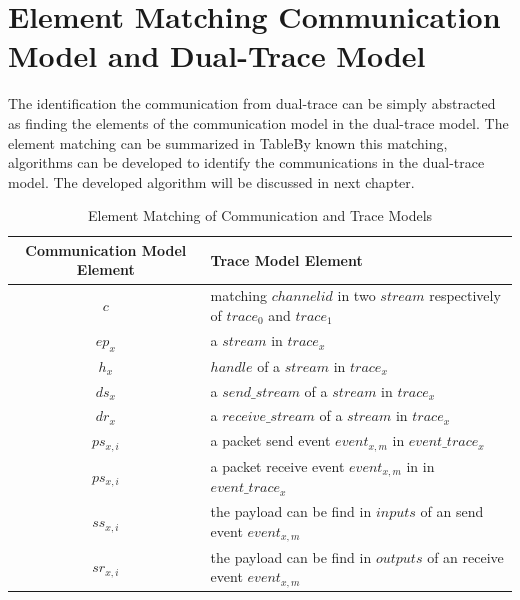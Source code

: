 \section{Element Matching Communication Model and Dual-Trace Model}
The identification the communication from dual-trace can be simply abstracted as finding the elements of the communication model in the dual-trace model. The element matching can be summarized in Table\. By known this matching, algorithms can be developed to identify the communications in the dual-trace model. The developed algorithm will be discussed in next chapter.
\begin{table}[H]
\centering
\caption{Element Matching of Communication and Trace Models}
\label{methodsInCategories}
\begin{tabular}{|c|l|}
 \hline
\textbf{Communication Model Element}& \textbf{Trace Model Element}\\
 \hline
$c$ & matching $channelid$ in two $stream$ respectively of $trace_{0}$ and $trace_{1}$  \\
 \hline
$ep_{x}$ & a $stream$ in $trace_{x}$ \\
 \hline
$h_{x}$ & $handle$ of a $stream$ in $trace_{x}$\\
 \hline
$ds_{x}$ & a $send\_stream$ of a $stream$ in $trace_{x}$ \\
 \hline
$dr_{x}$ & a $receive\_stream$ of a $stream$ in $trace_{x}$\\
 \hline
$ps_{x,i}$ & a packet send event $event_{x,m}$ in $event\_trace_{x}$\\
 \hline
$ps_{x,i}$ & a packet receive event $event_{x,m}$ in in $event\_trace_{x}$\\
 \hline
$ss_{x,i}$ & the payload can be find in $inputs$ of an send event $event_{x,m}$\\
 \hline
$sr_{x,i}$ & the payload can be find in $outputs$ of an receive event $event_{x,m}$\\
 \hline
\end{tabular}
\end{table}



